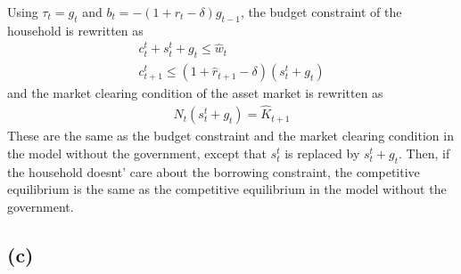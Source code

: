 \documentclass{ltjsarticle}
\begin{document}
Using $\tau_t = g_t$ and $b_t = -(1 + r_t - \delta) g_{t-1}$, the budget constraint of the household is rewritten as
\begin{gather*}
  c_t^t + s_t^t + g_t \leq \hat{w}_t\\
  c_{t+1}^t \leq (1 + \hat{r}_{t+1} - \delta) (s_t^t +  g_t)
\end{gather*}
and the market clearing condition of the asset market is rewritten as
\begin{gather*}
  N_t (s_t^t + g_t )= \hat{K}_{t+1}
\end{gather*}
These are the same as the budget constraint and the market clearing condition in the model without the government, except that $s_t^t$ is replaced by $s_t^t + g_t$. Then, if the household doesnt' care about the borrowing constraint, the competitive equilibrium is the same as the competitive equilibrium in the model without the government.

\subsection*{(c)}
\end{document}
